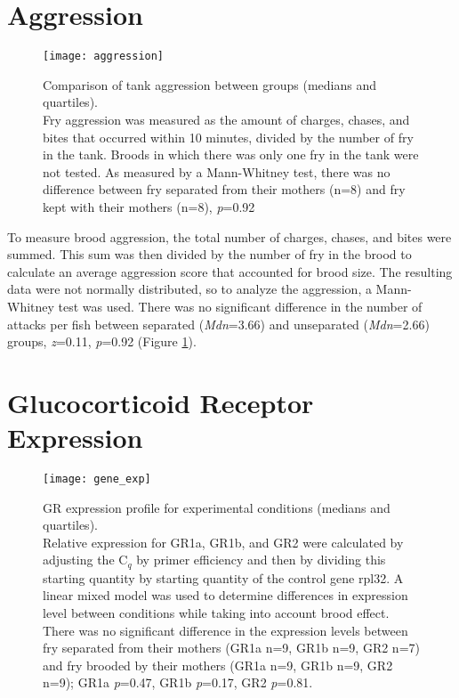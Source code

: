 \documentclass[12pt,twoside]{reedthesis}
\begin{document}
\section{Aggression}
\begin{figure}[htbp] 
\begin{center} 
\texttt{[image: aggression]}
\caption[Comparison of tank aggression between
groups]{\footnotesize{Comparison of tank aggression between groups (medians and quartiles).\\ Fry aggression was measured
  as the amount of charges, chases, and bites that occurred within 10 minutes,
  divided by the number of fry in the tank. Broods in which there was only one
  fry in the tank were not tested. As measured by a Mann-Whitney test,
  there was no difference between fry separated from their mothers (n=8) and fry kept
  with their mothers (n=8), \textit{p}=0.92}}
\label{aggression}
\end{center} 
\end{figure}

To measure brood aggression, the total number of charges, chases, and
bites were summed. This sum was then divided by the number of fry in the brood
to calculate an average aggression score that accounted for brood size. The
resulting data were not normally distributed, so to analyze the aggression, a Mann-Whitney test was used. There was no
significant difference in the number of attacks per fish between separated
(\textit{Mdn}=3.66) and unseparated (\textit{Mdn}=2.66) groups, \textit{z}=0.11,
\textit{p}=0.92 (Figure \ref{aggression}).

\section{Glucocorticoid Receptor Expression}

\begin{figure}[htbp] 
\begin{center} 
\texttt{[image: gene\_exp]}
\caption[GR expression profile for experimental
conditions]{\footnotesize{GR expression profile for experimental
      conditions (medians and quartiles).\\ Relative expression for GR1a, GR1b, and GR2 were calculated
  by adjusting the C$_{q}$ by primer efficiency and then by dividing this starting
  quantity by starting quantity of the control gene rpl32. A linear mixed model
  was used to determine differences in expression level between conditions while
  taking into account brood effect. There was no
  significant difference in the expression levels between fry separated from
  their mothers (GR1a n=9, GR1b n=9, GR2 n=7) and fry brooded by their mothers
  (GR1a n=9, GR1b n=9, GR2 n=9); GR1a
  \textit{p}=0.47, GR1b \textit{p}=0.17, GR2 \textit{p}=0.81.}}
\label{exp}
\end{center} 
\end{figure}
\end{document}
